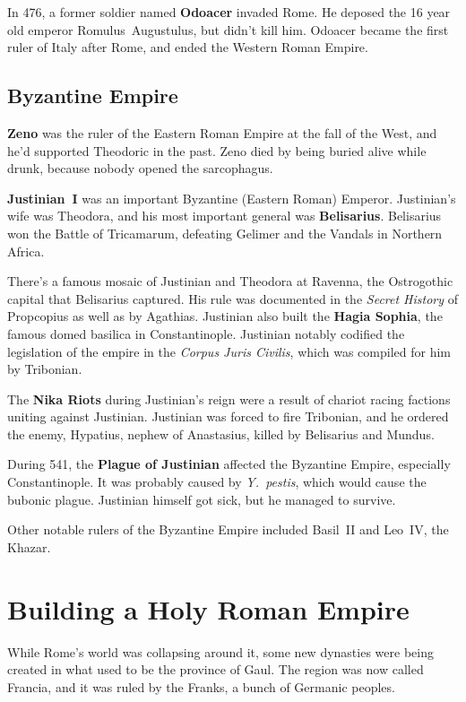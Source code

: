 In 476, a former soldier named \textbf{Odoacer} invaded Rome.
He deposed the 16 year old emperor Romulus~Augustulus, but didn't kill him.
Odoacer became the first ruler of Italy after Rome, and ended the Western Roman Empire.

\subsection*{Byzantine Empire}

\textbf{Zeno} was the ruler of the Eastern Roman Empire at the fall of the West,
and he'd supported Theodoric in the past.
Zeno died by being buried alive while drunk, because nobody opened the sarcophagus.

\textbf{Justinian~I} was an important Byzantine (Eastern Roman) Emperor.
Justinian's wife was Theodora, and his most important general was \textbf{Belisarius}.
Belisarius won the Battle of Tricamarum, defeating Gelimer and the Vandals in Northern Africa.

There's a famous mosaic of Justinian and Theodora at Ravenna,
the Ostrogothic capital that Belisarius captured.
His rule was documented in the \textit{Secret History} of Propcopius as well as by Agathias.
Justinian also built the \textbf{Hagia Sophia}, the famous domed basilica in Constantinople.
Justinian notably codified the legislation of the empire in the \textit{Corpus Juris Civilis},
which was compiled for him by Tribonian.

The \textbf{Nika Riots} during Justinian's reign were a result of chariot racing factions uniting against Justinian.
Justinian was forced to fire Tribonian,
and he ordered the enemy, Hypatius, nephew of Anastasius, killed by Belisarius and Mundus.

During 541, the \textbf{Plague of Justinian} affected the Byzantine Empire, especially Constantinople.
It was probably caused by \textit{Y.\ pestis}, which would cause the bubonic plague.
Justinian himself got sick, but he managed to survive.

Other notable rulers of the Byzantine Empire included Basil~II and Leo~IV, the Khazar.

\section{Building a Holy Roman Empire}

While Rome's world was collapsing around it,
some new dynasties were being created in what used to be the province of Gaul.
The region was now called Francia, and it was ruled by the Franks, a bunch of Germanic peoples.


